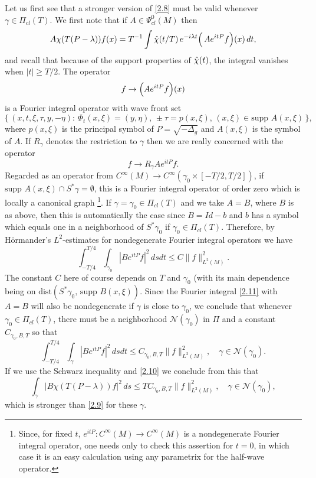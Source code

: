 \documentclass[10pt]{amsart}
\begin{document}
Let us first see that a stronger version of \eqref{2.8} must be valid whenever
$\gamma\in {\varPi}_{cl}(T)$.  We first note that if $A\in \Psi^0_{cl}(M)$ then
\begin{equation}\label{2.10}
A\chi(T(P-\lambda))f(x)=T^{-1}\int \Hat \chi(t/T) \, e^{-i\lambda t}
\Bigl(\, Ae^{itP}f\Bigr)(x)\, dt,
\end{equation}
and recall that because of the support properties of $\Hat \chi(t)$, the integral vanishes
when $|t|\ge T/2$.
The operator
$$f\to \Bigl(Ae^{itP}f\Bigr)(x)$$
is a Fourier integral operator with
wave front set
\begin{equation}\label{2.100}
\bigl\{\, (x,t,\xi,\tau, y,-\eta): \, \Phi_t(x,\xi)=(y,\eta), \, \pm \tau =p(x,\xi), \,
(x,\xi)\in \text{supp } A(x,\xi)\, \bigr\},
\end{equation}
where $p(x,\xi)$ is the principal symbol of $P=\sqrt{-\Delta_g}$ and $A(x,\xi)$ is the
symbol of $A$.  If $R_\gamma$ denotes the restriction to $\gamma$ then we are really concerned
with the operator
\begin{equation}\label{2.11}
f\to R_\gamma Ae^{itP}f.
\end{equation}
Regarded as an operator from $C^\infty(M)\to C^\infty
(\gamma_0\times [-T/2,T/2])$, if $\text{supp }A(x,\xi)\cap S^*\gamma = \emptyset$,
 this is a Fourier integral operator of order zero which is locally a canonical graph
\footnote{Since, for fixed $t$,  $e^{itP}: C^\infty(M)\to C^\infty(M)$ is a nondegenerate Fourier integral
operator, one needs only to check this assertion for $t=0$, in which case it is an easy
calculation using any parametrix for the half-wave operator.}.
If $\gamma=\gamma_0\in {\varPi}_{cl}(T)$
and we take $A=B$, where $B$ is as above, then this is automatically the case
since $B=Id-b$ and $b$ has a symbol which equals one in a neighborhood of $S^*\gamma_0$
if $\gamma_0\in {\varPi}_{cl}(T)$.  Therefore, by H\"ormander's \cite{hormander2}
$L^2$-estimates for nondegenerate Fourier integral operators we have
$$\int_{-T/4}^{T/4}\int_{\gamma_0}|Be^{itP}f|^2\, ds dt \le C\|f\|_{L^2(M)}^2.$$
The constant $C$ here of course depends on $T$ and $\gamma_0$ (with its main
dependence being on $\text{dist}(S^*\gamma_0, \, \text{supp }B(x,\xi))$.
Since the Fourier integral \eqref{2.11} with $A=B$
will also be nondegenerate if $\gamma$ is close to $\gamma_0$, we
conclude that whenever $\gamma_0\in {\varPi}_{cl}(T)$, there must be a
neighborhood ${\mathcal N}(\gamma_0)$ in ${\varPi}$ and a constant
$C_{\gamma_0,B,T}$ so that
$$\int_{-T/4}^{T/4}\int_\gamma |Be^{itP}f|^2\, ds dt
\le C_{\gamma_0,B,T}\|f\|_{L^2(M)}^2, \quad \gamma\in {\mathcal N}(\gamma_0).$$
If we use the Schwarz inequality and \eqref{2.10} we conclude from this that
\begin{equation}\label{2.111}
\int_\gamma |B\chi(T(P-\lambda))f|^2 \, ds \le TC_{\gamma_0,B,T}\|f\|_{L^2(M)}^2,
\quad \gamma\in {\mathcal N}(\gamma_0),
\end{equation}
which is stronger than \eqref{2.9} for these $\gamma$.
\end{document}
